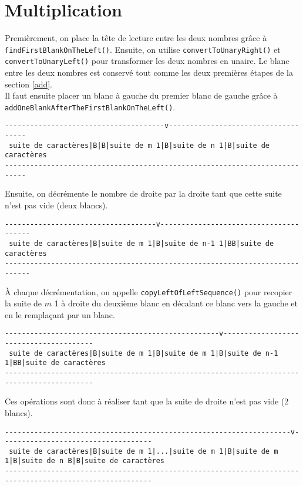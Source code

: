 \documentclass[a4paper,11pt]{article}
\begin{document}
\section{Multiplication}
Premièrement, on place la tête de lecture entre les deux nombres grâce à \texttt{findFirstBlankOnTheLeft()}.
Ensuite, on utilise \texttt{convertToUnaryRight()} et \texttt{convertToUnaryLeft()} pour transformer les deux nombres en unaire. Le blanc entre les deux nombres est conservé tout comme les deux premières étapes de la section \ref{add}.\\
Il faut ensuite placer un blanc à gauche du premier blanc de gauche grâce à \texttt{addOneBlankAfterTheFirst\-BlankOnTheLeft()}.
\begin{verbatim}
--------------------------------------v------------------------------------
 suite de caractères|B|B|suite de m 1|B|suite de n 1|B|suite de caractères
---------------------------------------------------------------------------
\end{verbatim}
Ensuite, on décrémente le nombre de droite par la droite tant que cette suite n'est pas vide (deux blancs).
\begin{verbatim}
------------------------------------v---------------------------------------
 suite de caractères|B|suite de m 1|B|suite de n-1 1|BB|suite de caractères
----------------------------------------------------------------------------
\end{verbatim}
À chaque décrémentation, on appelle \texttt{copyLeftOfLeftSequence()} pour recopier la suite de $m$ 1 à droite du deuxième blanc en décalant ce blanc vers la gauche et en le remplaçant par un blanc.
\begin{small}
\begin{verbatim}
---------------------------------------------------v---------------------------------------
 suite de caractères|B|suite de m 1|B|suite de m 1|B|suite de n-1 1|BB|suite de caractères
-------------------------------------------------------------------------------------------
\end{verbatim}
\end{small}
Ces opérations sont donc à réaliser tant que la suite de droite n'est pas vide (2 blancs).
\begin{footnotesize}
\begin{verbatim}
--------------------------------------------------------------------v------------------------------------
 suite de caractères|B|suite de m 1|...|suite de m 1|B|suite de m 1|B|suite de n B|B|suite de caractères
---------------------------------------------------------------------------------------------------------
\end{verbatim}
\end{footnotesize}
\end{document}
